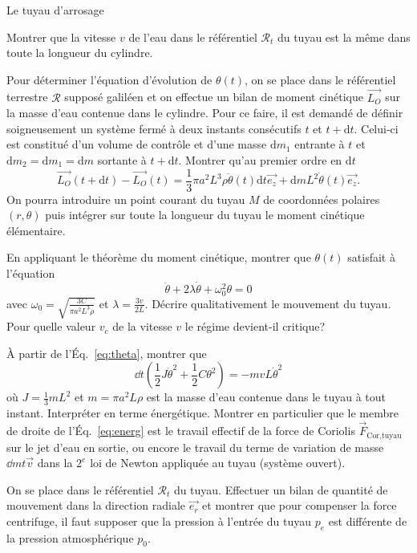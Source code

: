 \begin{exo}[PC]{Le tuyau d'arrosage}
\begin{quest}
\item Montrer que la vitesse $v$ de l'eau dans le référentiel $\mathcal{R}_t$ du tuyau est la même dans toute la longueur du cylindre.
\item Pour déterminer l'équation d'évolution de $\theta(t)$, on se place dans le référentiel terrestre $\mathcal{R}$ supposé galiléen et on effectue un bilan de moment cinétique $\Vec{L_O}$ sur la masse d'eau contenue dans le cylindre. Pour ce faire, il est demandé de définir soigneusement un système fermé à deux instants consécutifs $t$ et $t + \mathrm{d} t$. Celui-ci est constitué d'un volume de contrôle et d'une masse $\mathrm{d}m_1$ entrante à $t$ et $\mathrm{d}m_2=\mathrm{d}m_1=\mathrm{d}m$ sortante à $t + \mathrm{d} t$. Montrer qu'au premier ordre en $\mathrm{d} t$
\begin{equation}
\Vec{L_O}(t+\mathrm{d} t) - \Vec{L_O}(t) = \frac{1}{3}\pi a^2 L^3 \rho \ddot{\theta}(t) \mathrm{d} t \Vec{e_z} + \mathrm{d}m L^2 \dot{\theta}(t) \Vec{e_z}.
\end{equation}
On pourra introduire un point courant du tuyau $M$ de coordonnées polaires $(r,\theta)$ puis intégrer sur toute la longueur du tuyau le moment cinétique élémentaire.
\item En appliquant le théorème du moment cinétique, montrer que $\theta(t)$ satisfait à l'équation
\begin{equation}
\label{eq:theta}
\ddot{\theta} + 2 \lambda \dot{\theta} + \omega_0^2 \theta = 0
\end{equation}
avec $\omega_0 = \sqrt{\frac{3 C}{\pi a^2 L^3 \rho}}$ et $\lambda = \frac{3v}{2L}$. Décrire qualitativement le mouvement du tuyau. Pour quelle valeur $v_c$ de la vitesse $v$ le régime devient-il critique?

\item À partir de l'Éq.~\eqref{eq:theta}, montrer que
\begin{equation}
\label{eq:energ}
\dd{}{t}\left(\frac{1}{2} J \dot{\theta}^2 + \frac{1}{2} C \theta^2 \right) = -m v L \dot{\theta}^2
\end{equation}
où $J=\frac{1}{3}mL^2$ et $m=\pi a^2 L \rho$ est la masse d'eau contenue dans le tuyau à tout instant. Interpréter en terme énergétique. Montrer en particulier que le membre de droite de l'Éq.~\eqref{eq:energ} est le travail effectif de la force de Coriolis $\Vec{F}_{\text{Cor,tuyau}}$ sur le jet d'eau en sortie, ou encore le travail du terme de variation de masse $\dd{m}{t} \Vec{v}$ dans la $2^e$ loi de Newton appliquée au tuyau (système ouvert).

\item On se place dans le référentiel $\mathcal{R}_t$ du tuyau. Effectuer un bilan de quantité de mouvement dans la direction radiale $\Vec{e_r}$ et montrer que pour compenser la force centrifuge, il faut supposer que la pression à l'entrée du tuyau $p_e$ est différente de la pression atmosphérique $p_0$.

\end{quest}
\end{exo}

